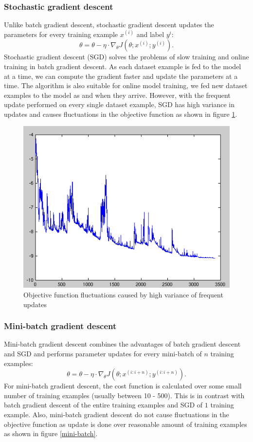 \documentclass[master]{thesis-uestc}
\begin{document}
\subsubsection{Stochastic gradient descent}
Unlike batch gradient descent, stochastic gradient descent updates the parameters for every training example $x^{(i)}$ and label $y^{i}$:
\begin{equation}
    \theta = \theta - \eta \cdot\nabla_\theta J(\theta;x^{(i)};y^{(i)}).
\end{equation}
Stochastic gradient descent (SGD) solves the problems of slow training and online training in batch gradient descent. As each dataset example is fed to the model at a time, we can compute the gradient faster and update the parameters at a time. The algorithm is also suitable for online model training, we fed new dataset examples to the model as and when they arrive. However, with the frequent update performed on every single dataset example, SGD has high variance in updates and causes fluctuations in the objective function as shown in figure \ref{SGD}.

\begin{figure}[ht]
\includegraphics[width=5in]{pic/fluctuation.png}
\caption{Objective function fluctuations caused by high variance of frequent updates}
\label{SGD}
\end{figure}

\subsubsection{Mini-batch gradient descent}
Mini-batch gradient descent combines the advantages of batch gradient descent and SGD and performs parameter updates for every mini-batch of $n$ training examples:
\begin{equation}
    \theta = \theta - \eta \cdot \nabla_\theta J(\theta; x^{(i:i+n)}; y^{(i:i+n)}).
\end{equation}
For mini-batch gradient descent, the cost function is calculated over some small number of training examples (usually between 10 - 500). This is in contrast with batch gradient descent of the entire training examples and SGD of $1$ training example. Also, mini-batch gradient descent do not cause fluctuations in the objective function as update is done over reasonable amount of training examples as shown in figure \ref{mini-batch}.
\end{document}
